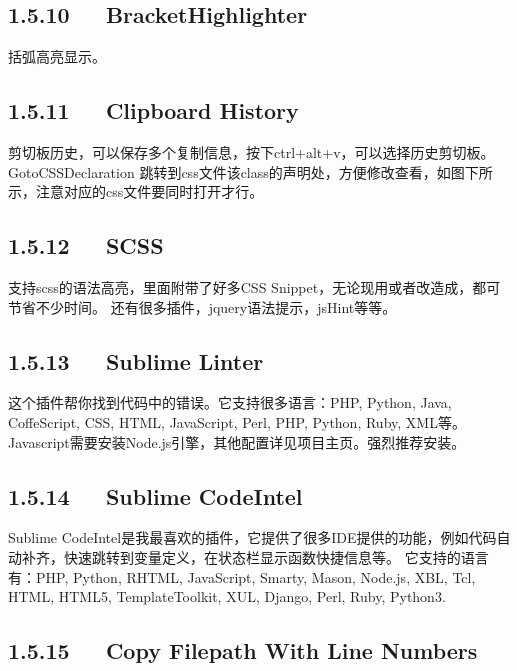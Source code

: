 \documentclass[letterpaper,12pt,english]{sphinxmanual}
\begin{document}
\subsection{1.5.10   BracketHighlighter}
\label{\detokenize{001software/001install/sublime:brackethighlighter}}
括弧高亮显示。


\subsection{1.5.11   Clipboard History}
\label{\detokenize{001software/001install/sublime:clipboard-history}}
\begin{sphinxVerbatim}[commandchars=\\\{\}]
剪切板历史，可以保存多个复制信息，按下ctrl+alt+v，可以选择历史剪切板。
Goto\PYGZhy{}CSS\PYGZhy{}Declaration
跳转到css文件该class的声明处，方便修改查看，如图下所示，注意对应的css文件要同时打开才行。
\end{sphinxVerbatim}


\subsection{1.5.12   SCSS}
\label{\detokenize{001software/001install/sublime:scss}}
支持scss的语法高亮，里面附带了好多CSS
Snippet，无论现用或者改造成，都可节省不少时间。
还有很多插件，jquery语法提示，jsHint等等。


\subsection{1.5.13   Sublime Linter}
\label{\detokenize{001software/001install/sublime:sublime-linter}}
这个插件帮你找到代码中的错误。它支持很多语言：PHP, Python, Java,
CoffeScript, CSS, HTML, JavaScript, Perl, PHP, Python, Ruby,
XML等。Javascript需要安装Node.js引擎，其他配置详见项目主页。强烈推荐安装。


\subsection{1.5.14   Sublime CodeIntel}
\label{\detokenize{001software/001install/sublime:sublime-codeintel}}
Sublime
CodeIntel是我最喜欢的插件，它提供了很多IDE提供的功能，例如代码自动补齐，快速跳转到变量定义，在状态栏显示函数快捷信息等。
它支持的语言有：PHP, Python, RHTML, JavaScript, Smarty, Mason, Node.js,
XBL, Tcl, HTML, HTML5, TemplateToolkit, XUL, Django, Perl, Ruby,
Python3.


\subsection{1.5.15   Copy Filepath With Line Numbers}
\label{\detokenize{001software/001install/sublime:copy-filepath-with-line-numbers}}
\end{document}
